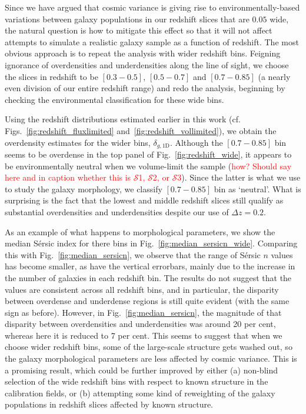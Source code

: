 \documentclass[twocolumn,useAMS,usenatbib]{mn2e}
\newcommand{\rachel}[1]{{\textcolor{red}{#1}}}
\newcommand{\sersic}{S\'{e}rsic }
\newcommand{\s}{\ensuremath{\mathcal{S}}}
\begin{document}
Since we have argued that cosmic variance is giving rise to
environmentally-based variations between galaxy populations in our
redshift slices that are $0.05$ wide, the natural question is how to
mitigate this effect so that it will not affect attempts to simulate a
realistic galaxy sample as a function of redshift.  The most obvious
approach is to repeat the analysis with wider redshift bins. Feigning ignorance of overdensities and underdensities along the line of sight, we choose the slices in redshift to be $\left[ 0.3 - 0.5 \right]$,
$\left[ 0.5 - 0.7\right]$ and $\left[ 0.7 - 0.85\right]$ (a nearly
even division of our entire redshift range) and redo the analysis,
beginning by checking the environmental classification for these wide bins.

Using the redshift distributions estimated earlier in this work (cf. Figs.~\ref{fig:redshift_fluxlimited}
and~\ref{fig:redshift_vollimited}), we obtain the overdensity estimates for
the wider bins, $\delta_{g,\text{1D}}$.
Although the $\left[ 0.7 - 0.85\right]$ bin seems to be overdense in
the top panel of Fig.~\ref{fig:redshift_wide}, it appears to be
environmentally neutral when we volume-limit the sample (\rachel{how?
  Should say here and in caption whether this is \s1, \s2, or \s3}).
Since the latter is what we use to study the galaxy morphology, we
classify $\left[ 0.7 - 0.85\right]$ bin as `neutral'.
What is surprising is the fact that the lowest and middle redshift
slices still qualify as substantial overdensities and underdensities
despite our use of $\Delta z=0.2$.

As an example of what happens to morphological parameters, we show the
median \sersic index for there bins in
Fig.~\ref{fig:median_sersicn_wide}.  Comparing this with
Fig.~\ref{fig:median_sersicn}, we observe that the 
range of \sersic $n$ values has become smaller, as have the vertical errorbars, mainly due to the increase in the number of galaxies in each redshift bin. The results do not suggest that the values
are consistent across all redshift bins, and in particular, the
disparity between overdense and underdense regions is still quite
evident (with the same sign as before). However, in
Fig.~\ref{fig:median_sersicn}, the magnitude of that disparity between
overdensities and underdensities was around 20 per cent, whereas here
it is reduced to 7 per cent.  This seems to suggest that when we
choose wider redshift bins, some of the large-scale structure gets washed out, 
so the galaxy morphological parameters are less affected by cosmic
variance.  This is a promising result, which could be further improved
by either (a) non-blind selection of the wide redshift bins with respect to
known structure in the calibration fields, or (b) attempting some kind of
reweighting of the galaxy populations in redshift slices affected by
known structure.
\end{document}
